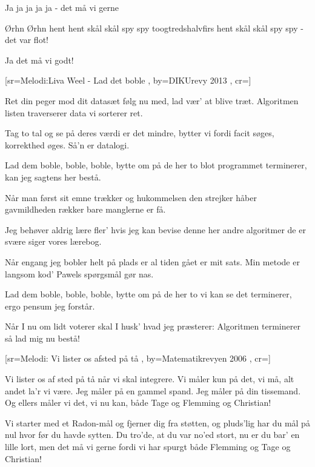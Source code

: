 \documentclass[pdftex,12pt]{article}
\begin{document}
\begin{songs}{}
\endverse
\beginverse
Ja ja ja ja ja - det må vi gerne

\endverse
\beginverse
Ørhn Ørhn hent hent skål skål spy spy
toogtredshalvfirs hent skål skål spy spy
- det var flot!

\endverse
\beginverse
Ja det må vi godt!

\endverse
\endsong


[sr={Melodi:Liva Weel - Lad det boble}
,
by={DIKUrevy 2013}
,
cr={}]\hypertarget{Bobbelsortering}{}
\label{song44}

\beginverse
Ret din peger mod dit datasæt
følg nu med, lad vær' at blive træt.
Algoritmen listen traverserer
data vi sorterer ret.

\endverse
\beginverse
Tag to tal og se på deres værdi
er det mindre, bytter vi fordi
facit søges, korrekthed øges.
Så'n er datalogi.

\endverse
\beginverse
Lad dem boble, boble, boble,
bytte om på de her to
blot programmet terminerer,
kan jeg sagtens her bestå.

\endverse
\beginverse
Når man først sit emne trækker
og hukommelsen den strejker
håber gavmildheden rækker
bare manglerne er få.

\endverse
\beginverse
Jeg behøver aldrig lære fler'
hvis jeg kan bevise denne her
andre algoritmer de er svære
siger vores lærebog.

\endverse
\beginverse
Når engang jeg bobler helt på plads
er al tiden gået er mit sats.
Min metode er langsom kod'
Pawels spørgsmål gør nas.

\endverse
\beginverse
Lad dem boble, boble, boble,
bytte om på de her to
vi kan se det terminerer,
ergo pensum jeg forstår.

\endverse
\beginverse
Når I nu om lidt voterer
skal I husk' hvad jeg præsterer:
Algoritmen terminerer
så lad mig nu bestå!

\endverse
\endsong



﻿[sr={Melodi: Vi lister os afsted på tå}
,
by={Matematikrevyen 2006}
,
cr={}]\hypertarget{Målteorisangen}{}
\label{song45}

\beginverse
Vi lister os af sted på tå
når vi skal integrere.
Vi måler kun på det, vi må,
alt andet la’r vi være.
Jeg måler på en gammel spand.
Jeg måler på din tissemand.
Og ellers måler vi det, vi nu kan,
både Tage og Flemming og Christian!

\endverse
\beginverse
Vi starter med et Radon-mål
og fjerner dig fra støtten,
og pluds’lig har du mål på nul
hvor før du havde sytten.
Du tro’de, at du var no’ed stort,
nu er du bar’ en lille lort,
men det må vi gerne fordi vi har spurgt
både Flemming og Tage og Christian!


\end{songs}
\end{document}
